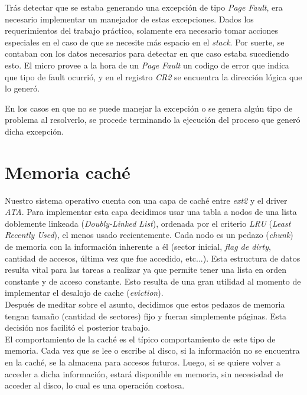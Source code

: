 \documentclass[a4paper,10pt]{article}
\begin{document}
Trás detectar que se estaba generando una excepción de tipo \textit{Page Fault}, era necesario implementar un manejador de estas excepciones.
Dados los requerimientos del trabajo práctico, solamente era necesario tomar acciones especiales en el caso de que se necesite más espacio en el \textit{stack}.
Por suerte, se contaban con los datos necesarios para detectar en que caso estaba sucediendo esto.
El micro provee a la hora de un \textit{Page Fault} un codigo de error que indica que tipo de fault ocurrió, y en el registro \textit{CR2} se encuentra la dirección 
lógica que lo generó.

En los casos en que no se puede manejar la excepción o se genera algún tipo de problema al resolverlo, se procede terminando la ejecución del proceso que 
generó dicha excepción.

\newpage

\section{Memoria caché}
\label{sec:Memoria caché}
Nuestro sistema operativo cuenta con una capa de caché entre \textit{ext2} y el driver \textit{ATA}. Para implementar esta capa decidimos usar una tabla 
a nodos de una lista doblemente linkeada (\textit{Doubly-Linked List}), ordenada por el criterio \textit{LRU} (\textit{Least Recently Used}), el menos usado
 recientemente. Cada nodo es un pedazo (\textit{chunk}) de memoria con la información inherente a él (sector inicial, \textit{flag de dirty}, 
cantidad de accesos, última vez que fue accedido, etc...). Esta estructura de datos resulta vital para las tareas a realizar ya que permite tener una lista
en orden constante y de acceso constante. Esto resulta de una gran utilidad al momento de implementar el desalojo de cache (\textit{eviction}).\\

Después de meditar sobre el asunto, decidimos que estos pedazos de memoria tengan tamaño (cantidad de sectores)
fijo y fueran simplemente páginas. Esta decisión nos facilitó el posterior trabajo.\\

El comportamiento de la caché es el típico comportamiento de este tipo de memoria. Cada vez que se lee o escribe al disco, si la información no se encuentra en la caché, se
 la almacena para accesos futuros. Luego, si se quiere volver a acceder a dicha información, estará disponible en memoria, sin necesisdad de acceder al disco, lo 
cual es una operación costosa.\\
\end{document}
